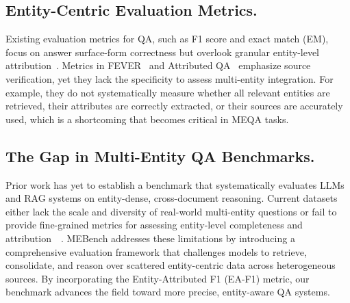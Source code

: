 \subsection{Entity-Centric Evaluation Metrics.}
Existing evaluation metrics for QA, such as F1 score and exact match (EM), focus on answer surface-form correctness but overlook granular entity-level attribution~\citep{5707187}. Metrics in  FEVER~\citep{thorne2018fever} and Attributed QA~\citep{bohnet2023attribut} emphasize source verification, yet they lack the specificity to assess multi-entity integration. For example, they do not systematically measure whether all relevant entities are retrieved, their attributes are correctly extracted, or their sources are accurately used, which is a shortcoming that becomes critical in MEQA tasks.

\subsection{The Gap in Multi-Entity QA Benchmarks.}
Prior work has yet to establish a benchmark that systematically evaluates LLMs and RAG systems on entity-dense, cross-document reasoning. Current datasets either lack the scale and diversity of real-world multi-entity questions or fail to provide fine-grained metrics for assessing entity-level completeness and attribution~\citep{2024Leave}~\citep{bai2025longbenchv2}. MEBench addresses these limitations by introducing a comprehensive evaluation framework that challenges models to retrieve, consolidate, and reason over scattered entity-centric data across heterogeneous sources. By incorporating the Entity-Attributed F1 (EA-F1) metric, our benchmark advances the field toward more precise, entity-aware QA systems.

